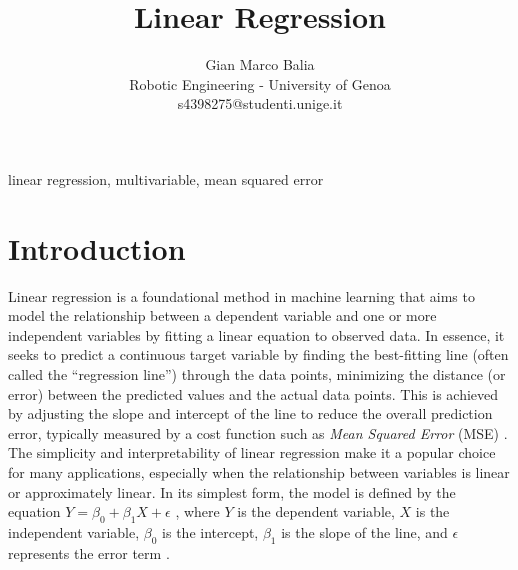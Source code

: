 \documentclass[9pt,technote]{IEEEtran}
\title{Linear Regression}
\author{
	Gian Marco Balia\\
	Robotic Engineering - University of Genoa\\
	s4398275@studenti.unige.it
}
\begin{document}
\maketitle

\begin{abstract}

\end{abstract}
\begin{IEEEkeywords}
linear regression, multivariable, mean squared error
\end{IEEEkeywords}

\section{Introduction}
Linear regression is a foundational method in machine learning that aims to model the relationship between a dependent variable and one or more independent variables by fitting a linear equation to observed data. In essence, it seeks to predict a continuous target variable by finding the best-fitting line (often called the “regression line”) through the data points, minimizing the distance (or error) between the predicted values and the actual data points. This is achieved by adjusting the slope and intercept of the line to reduce the overall prediction error, typically measured by a cost function such as \textit{Mean Squared Error} (MSE) \cite{montgomery2012introduction}.
The simplicity and interpretability of linear regression make it a popular choice for many applications, especially when the relationship between variables is linear or approximately linear. In its simplest form, the model is defined by the equation  $Y = \beta_0 + \beta_1 X + \epsilon$ , where  $Y$  is the dependent variable,  $X$  is the independent variable,  $\beta_0$  is the intercept,  $\beta_1$  is the slope of the line, and  $\epsilon$  represents the error term \cite{hastie2009elements}.
\end{document}

